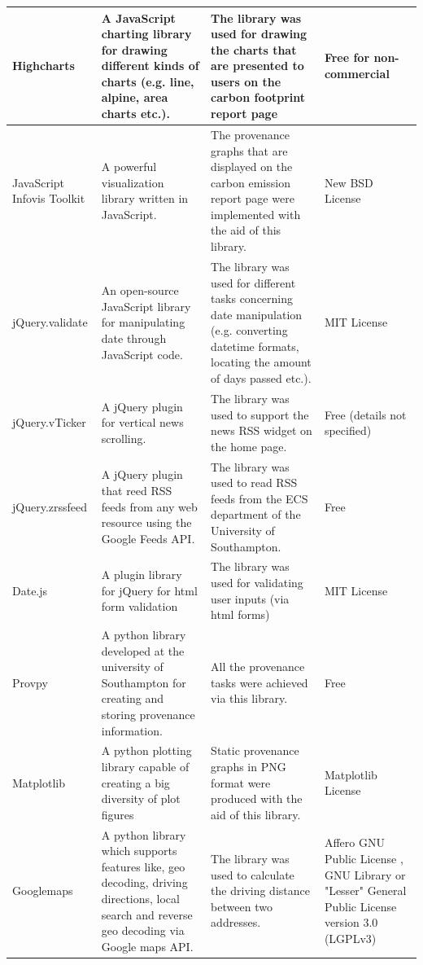 \begin{longtable}{|p{100px}|p{100px}|p{100px}|p{100px}|}
    Highcharts & A JavaScript charting library for drawing different kinds of charts (e.g. line, alpine, area charts etc.). & The library was used for drawing the charts that are presented to users on the carbon footprint report page & Free for non-commercial \\
    \hline

    JavaScript Infovis Toolkit & A powerful visualization library written in JavaScript. & The provenance graphs that are displayed on the carbon emission report page were implemented with the aid of this library. & New BSD License \\
    \hline

    jQuery.validate & An open-source JavaScript library for manipulating date through JavaScript code. & The library was used for different tasks concerning date manipulation (e.g. converting datetime formats, locating the amount of days passed etc.). & MIT License \\
    \hline

    jQuery.vTicker & A jQuery plugin for vertical news scrolling. & The library was used to support the news RSS widget on the home page. & Free (details not specified) \\
    \hline

    jQuery.zrssfeed & A jQuery plugin that reed RSS feeds from any web resource using the Google Feeds API. & The library was used to read RSS feeds from the ECS department of the University of Southampton. & Free \\
    \hline

    Date.js & A plugin library for jQuery for html form validation & The library was used for validating  user inputs (via html forms) & MIT License \\
    \hline

    Provpy & A python library developed at the university of Southampton for creating and storing provenance information.  & All the provenance tasks were achieved via this library. & Free \\
    \hline

    Matplotlib & A python plotting library capable of creating a big diversity of plot figures  & Static provenance graphs in PNG format were produced with the aid of this library.  & Matplotlib License \\
    \hline

    Googlemaps  & A python library which supports features like, geo decoding, driving directions, local search and reverse geo decoding via Google maps API. & The library was used to calculate the driving distance between two addresses.  & Affero GNU Public License , GNU Library or "Lesser" General Public License version 3.0 (LGPLv3) \\
    \hline


\end{longtable}
